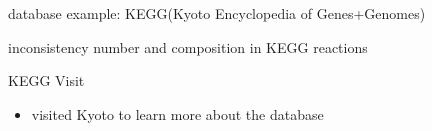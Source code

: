 \documentclass[style=aggie]{powerdot}
\begin{document}
\begin{slide}{database example: KEGG\newline (Kyoto Encyclopedia of Genes+Genomes)}
\begin{figure}
\begin{small}
\end{small}

\end{figure}
inconsistency number and composition in KEGG reactions
\end{slide}

\begin{slide}{KEGG Visit}
 \begin{itemize}
  \item visited Kyoto to learn more about the database
  
 \end{itemize}

\end{slide}
\end{document}
